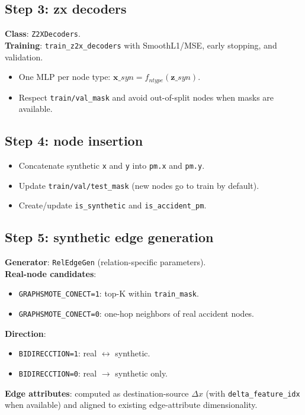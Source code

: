 \subsection{Step 3: z\textrightarrow x decoders}
\textbf{Class}: \texttt{Z2XDecoders}.\\
\textbf{Training}: \texttt{train\_z2x\_decoders} with SmoothL1/MSE, early stopping, and validation.
\begin{itemize}[leftmargin=*]
  \item One MLP per node type: $\mathbf{x}\_{syn} = f_{ntype}(\mathbf{z}\_{syn})$.
  \item Respect \texttt{train/val\_mask} and avoid out-of-split nodes when masks are available.
\end{itemize}

\subsection{Step 4: node insertion}
\begin{itemize}[leftmargin=*]
  \item Concatenate synthetic \texttt{x} and \texttt{y} into \texttt{pm.x} and \texttt{pm.y}.
  \item Update \texttt{train/val/test\_mask} (new nodes go to train by default).
  \item Create/update \texttt{is\_synthetic} and \texttt{is\_accident\_pm}.
\end{itemize}

\subsection{Step 5: synthetic edge generation}
\textbf{Generator}: \texttt{RelEdgeGen} (relation-specific parameters).\\
\textbf{Real-node candidates}:
\begin{itemize}[leftmargin=*]
  \item \texttt{GRAPHSMOTE\_CONECT=1}: top-K within \texttt{train\_mask}.
  \item \texttt{GRAPHSMOTE\_CONECT=0}: one-hop neighbors of real accident nodes.
\end{itemize}
\textbf{Direction}:
\begin{itemize}[leftmargin=*]
  \item \texttt{BIDIRECCTION=1}: real $\leftrightarrow$ synthetic.
  \item \texttt{BIDIRECCTION=0}: real $\to$ synthetic only.
\end{itemize}
\textbf{Edge attributes}: computed as destination-source $\Delta x$ (with \texttt{delta\_feature\_idx} when available) and aligned to existing edge-attribute dimensionality.

